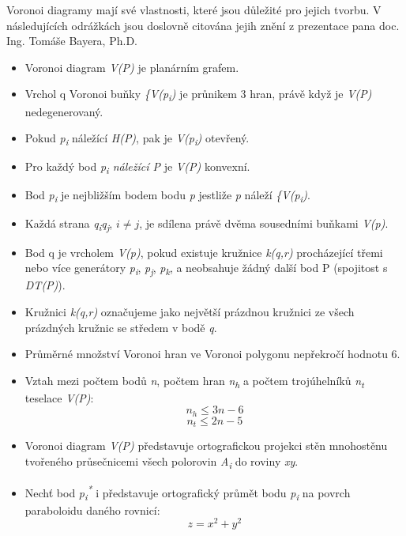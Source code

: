 Voronoi diagramy mají své vlastnosti, které jsou důležité pro jejich tvorbu. V následujících
odrážkách jsou doslovně citována jejih znění z prezentace pana doc. Ing. Tomáše Bayera, Ph.D.

\begin{itemize}
\item Voronoi diagram \textit{V(P)} je planárním grafem.
\item Vrchol q Voronoi buňky \textit{\{V(p\textsubscript{i})} je průnikem 3 hran, právě když je \textit{V(P)} nedegenerovaný.
\item Pokud \textit{p\textsubscript{i}} náležící \textit{H(P)}, pak je \textit{V(p\textsubscript{i})}  otevřený. 
\item Pro každý bod \textit{p\textsubscript{i} náležící P} je \textit{V(P)} konvexní. 
\item Bod \textit{p\textsubscript{i}} je nejbližším bodem bodu \textit{p}
jestliže \textit{p} náleží \textit{\{V(p\textsubscript{i})}.
\item Každá strana \textit{q\textsubscript{i}q\textsubscript{j}}, \(i \neq j\),
je sdílena právě dvěma sousedními buňkami \textit{V(p)}. 
\item Bod q je vrcholem \textit{V(p)}, pokud existuje kružnice \textit{k(q,r)} procházející třemi
nebo více generátory \textit{p\textsubscript{i}}, \textit{p\textsubscript{j}},
\textit{p\textsubscript{k}}, a neobsahuje žádný další bod P (spojitost s \textit{DT(P)}). 
\item Kružnici \textit{k(q,r)} označujeme jako největší prázdnou kružnici ze všech prázdných kružnic se středem v bodě \textit{q}. 
\item Průměrné množství Voronoi hran ve Voronoi polygonu nepřekročí hodnotu 6. 
\item Vztah mezi počtem bodů \textit{n}, počtem hran \textit{n\textsubscript{h}}
a počtem trojúhelníků \textit{n\textsubscript{t}} teselace \textit{V(P)}:
\[ n_h \leq 3n-6\]
\[ n_t \leq 2n−5\]
\item Voronoi diagram \textit{V(P)} představuje ortografickou projekci stěn
mnohostěnu tvořeného průsečnicemi všech polorovin \textit{A\textsubscript{i}} do roviny \textit{xy}. 
\item Nechť bod \textit{p\textsubscript{i}\textsuperscript{*}} i představuje
ortografický průmět bodu \textit{p\textsubscript{i}} na povrch paraboloidu daného rovnicí:
\[ z = x^2 + y^2 \]
   
\end{itemize}

